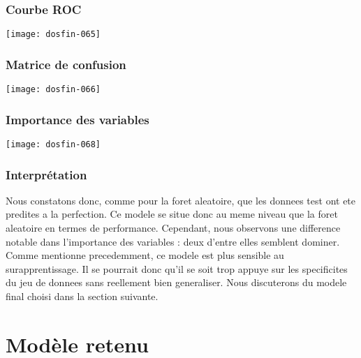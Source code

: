 \documentclass[a4paper,11pt]{article}
\begin{document}
\subsubsection{Courbe ROC}

\begin{center}

\texttt{[image: dosfin-065]}

\end{center}

\subsubsection{Matrice de confusion}

\begin{center}

\texttt{[image: dosfin-066]}

\end{center}


\subsubsection{Importance des variables}

\begin{center}



\texttt{[image: dosfin-068]}

\end{center}

\newpage

\subsubsection{Interprétation}

Nous constatons donc, comme pour la foret aleatoire, que les donnees test ont ete predites a la perfection.  
Ce modele se situe donc au meme niveau que la foret aleatoire en termes de performance.  
Cependant, nous observons une difference notable dans l'importance des variables : deux d'entre elles semblent dominer.  
Comme mentionne precedemment, ce modele est plus sensible au surapprentissage. Il se pourrait donc qu'il se soit trop appuye sur les specificites du jeu de donnees sans reellement bien generaliser.  
Nous discuterons du modele final choisi dans la section suivante.


\section{Modèle retenu}
\end{document}
